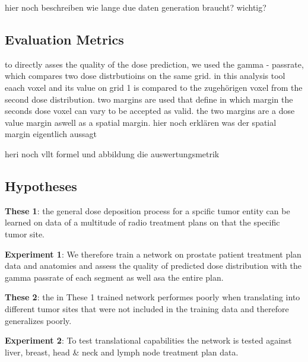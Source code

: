 hier noch beschreiben wie lange due daten generation braucht? wichtig? 

\subsection{Evaluation Metrics}

to directly asses the quality of the dose prediction, we used the gamma - passrate, which compares two dose distrbutioins on the same grid. in this analysis tool eaach voxel and its value on grid 1 is compared to the zugehörigen voxel from the second dose distribution. two margins are used that define in which margin the seconds dose voxel can vary to be accepted as valid. the two margins are a dose value margin aswell as a spatial margin. hier noch erklären was der spatial margin eigentlich aussagt

heri noch vllt formel und abbildung die auswertungsmetrik

\subsection{Hypotheses}

\begin{hangingpar}
    \item\textbf{These 1}: the general dose deposition process for a spcific tumor entity can be learned on data of a multitude of radio treatment plans on that the specific tumor site. 
    \item\textbf{Experiment 1}: We therefore train a network on prostate patient treatment plan data and anatomies and assess the quality of predicted dose distribution with the gamma passrate of each segment as well asa the entire plan. 
\end{hangingpar}

\begin{hangingpar}
    \item\textbf{These 2}: the in These 1 trained network performes poorly when translating into different tumor sites that were not included in the training data and therefore generalizes poorly. 
    \item\textbf{Experiment 2}: To test translational capabilities the network is tested against liver, breast, head \& neck and lymph node treatment plan data.
\end{hangingpar}

